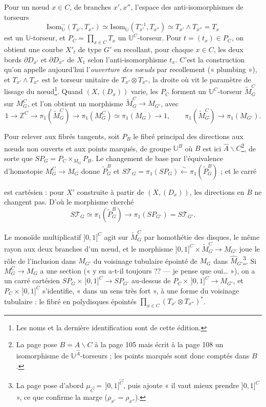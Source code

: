 \documentclass[11pt,a4paper]{article}
\begin{document}
Pour un nœud $x \in C$, de branches $x', x''$, l'espace des
anti-isomorphismes de torseurs
\[
\mathrm{Isom}^{-}_{\mathbb{U}}(T_{x'}, T_{x''}) \simeq
\mathrm{Isom}_{\mathbb{U}}(T_{x'}^{-1}, T_{x''}) \simeq T_{x'} \wedge T_{x''} =
T_x
\]
est un $\mathbb{U}$-torseur, et $P_C = \prod_{x \in C} T_x$ un
$\mathbb{U}^{C}$-torseur. Pour $t = (t_x) \in P_C$, on obtient une courbe
$X'_t$ de type $G'$ en recollant, pour chaque $x \in C$, les deux bords
$\partial D_{x'}$ et $\partial D_{x''}$ de $X_1$ selon l'anti-isomorphisme
$t_x$. C'est la construction qu'on appelle aujourd'hui l'\emph{ouverture des
nœuds} par recollement (« plumbing »), et $T_{x'} \wedge T_{x''}$ est le
torseur unitaire de $T_{x'} \otimes T_{x''}$, la droite où vit le paramètre de
lissage du nœud\footnote{Les noms et la dernière identification sont de cette
édition.}. Quand $(X, (D_x))$ varie, les $P_C$ forment un
$\mathbb{U}^C$-torseur $\widetilde{M}^C_G$ sur $M^C_G$, et l'on obtient un
morphisme $\widetilde{M}^C_G \to M_{G'}$, avec
\[
1 \to \mathbb{Z}^C \to \pi_1(\widetilde{M}^C_G) \to \pi_1(M^C_G) \simeq
\pi_1(M_G) \to 1, \qquad \pi_1(\widetilde{M}^C_G) \to \pi_1(M_{G'}).
\]

Pour relever aux fibrés tangents, soit $P_B$ le fibré principal des directions aux nœuds non ouverts et aux
points marqués, de groupe $\mathbb{U}^{B}$ où $B$ est ici $\hat A
\smallsetminus C$\footnote{La page pose $B = A \smallsetminus C$ à la page 105
mais écrit à la page 108 un isomorphisme de $\mathbb{U}^{\hat A}$-torseurs ;
les points marqués sont donc comptés dans $B$.}, de sorte que $SP_G = P_C \times_{M_G}
P_B$. Le changement de base par l'équivalence d'homotopie $M^C_G \to M_G$
donne $\widetilde{P}^B_G$ et $S\mathcal{T}_G = \pi_1(SP_G) \xleftarrow{\sim}
\pi_1(\widetilde{P}^B_G)$ ; et le carré


est cartésien : pour $X'$ construite à partir de $(X, (D_x))$, les directions
en $B$ ne changent pas. D'où le morphisme cherché
\[
S\mathcal{T}_G \simeq \pi_1(\widetilde{P}^B_G) \longrightarrow
\pi_1(SP_{G'}) = S\mathcal{T}_{G'} .
\]

Le monoïde multiplicatif $]0,1]^{C}$ agit sur $\widetilde{M}^C_G$ par
homothétie des disques, le même rayon aux deux branches d'un nœud, et le
morphisme $]0,1]^C \times \widetilde{M}^C_G \to M_{G'}$ joue le rôle de
l'inclusion dans $M_{G'}$ du voisinage tubulaire épointé de $M_G$ dans
$\widehat{M}_{G'}$\footnote{La page pose d'abord $\mu_{\vec C} =\,
]0,1]^{\vec C}$, puis ajoute « il vaut mieux prendre $]0,1]^{C}$ », ce que
confirme la marge ($\rho_{x'} = \rho_{x''}$).}. Si $M^C_G \to M_G$ a une
section (« y en a-t-il toujours ?? — je pense que oui… »), on a un carré
cartésien $SP_G \times\, ]0,1]^C \to SP_{G'}$ au-dessus de $P_C \times\,
]0,1]^C \to M_{G'}$, et $P_C \times\, ]0,1]^C$ s'identifie, « dans un sens
très fort », à une forme du voisinage tubulaire : le fibré en polydisques
épointés $\prod_{x \in C} (T_{x'} \otimes T_{x''})^{*}$.
\end{document}
